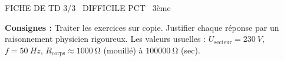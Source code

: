 \documentclass[11pt]{article}
\begin{document}
\begin{tcolorbox}[enhanced,colback=popink,colframe=popink,arc=10pt,boxrule=0pt,left=12pt,right=12pt,top=9pt,bottom=9pt]
{\color{white}\popxbold\small FICHE DE TD 3/3 \textbullet\ DIFFICILE \hfill PCT \textbullet\ 3ème\par}
\end{tcolorbox}
\vspace{4pt}
\noindent \textbf{Consignes :} Traiter les exercices sur copie. Justifier chaque réponse par un raisonnement physicien rigoureux. Les valeurs usuelles : $U_{\text{secteur}}=\SI{230}{V}$, $f=\SI{50}{Hz}$, $R_{\text{corps}}\approx\SI{1000}{\ohm}$ (mouillé) à $\SI{100000}{\ohm}$ (sec).
\end{document}
